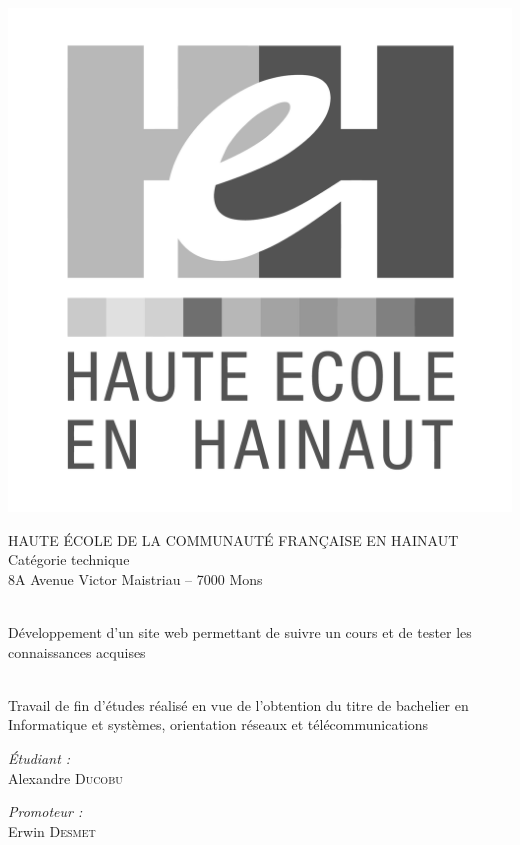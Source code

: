 \begin{center}
  \includegraphics[scale=0.12]{textures/logo/heh_bw.pdf}

  \vspace{0.5cm}

  HAUTE ÉCOLE DE LA COMMUNAUTÉ FRANÇAISE EN HAINAUT \\
  Catégorie technique \\
  8A Avenue Victor Maistriau – 7000 Mons \\ [0.5cm]

  \begingroup
   \selectfont 

  \HRule \\ [0.4cm] {
    \huge Développement d'un site web permettant de suivre un cours et de tester les connaissances acquises \\ [0.2cm] 
  }
  \HRule \\ [0.3cm]
  \endgroup
  
  Travail de fin d'études réalisé en vue de l'obtention du titre de bachelier en Informatique et systèmes, orientation réseaux et télécommunications \\ [1cm]
  
  \begin{minipage}[t]{0.4 \textwidth} 
    \begin{flushleft} 
      \large \emph{Étudiant :} \\ 
      Alexandre \textsc{Ducobu}
    \end{flushleft} 
  \end{minipage}
  \begin{minipage}[t]{0.4 \textwidth}
    \begin{flushright} 
      \large \emph{Promoteur :} \\ 
      Erwin \textsc{Desmet}
    \end{flushright} 
  \end{minipage}


\end{center}
